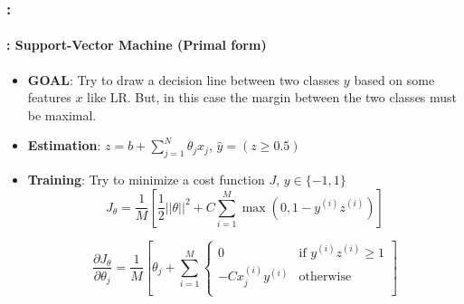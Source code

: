 \documentclass[xcolor=table]{beamer}
\begin{document}
\begin{frame}
	\frametitle{\insertshortsubtitle: \insertsection}
	\framesubtitle{\insertsubsection: Support-Vector Machine (Primal form)}
	
	\begin{minipage}{0.75\textwidth} 
		\begin{itemize}
			\item \textbf{GOAL}: Try to draw a decision line between two classes $ y $ based on some features $ x $ like LR. But, in this case the margin between the two classes must be maximal.
			\item \textbf{Estimation}: $ z = b + \sum_{j=1}^{N} \theta_j x_j $, 
			$ \hat{y} = (z \ge 0.5)$
		\end{itemize}
	\end{minipage}
	\begin{minipage}{0.24\textwidth} 
	\end{minipage}
	
	\begin{itemize}
		\item \textbf{Training}: Try to minimize a cost function $ J $, $ y \in \{-1, 1\} $
		\[J_\theta = \frac{1}{M} \left[ \frac{1}{2}||\theta||^2 + C \sum\limits_{i=1}^{M} \max (0, 1 - y^{(i)} z^{(i)}) \right]
		\]
		
		\[\frac{\partial J_\theta}{\partial \theta_{j}} = \frac{1}{M} \left[ \theta_j + \sum\limits_{i=1}^{M} \begin{cases}
			0 & \text{if } y^{(i)} z^{(i)} \ge 1\\
			- C x^{(i)}_j y^{(i)} & \text{otherwise}  \\
		\end{cases} \right]
		\]
	\end{itemize}
	
\end{frame}
\end{document}
